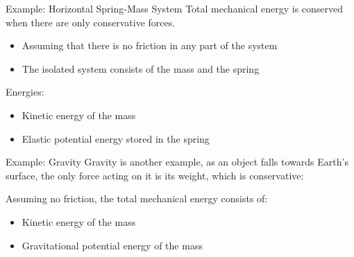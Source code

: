 \documentclass[12pt,compress,aspectratio=169]{beamer}
\newcommand{\mb}[1]{\ensuremath\mathbf{#1}}
\begin{document}
\begin{frame}{Example: Horizontal Spring-Mass System}
  Total mechanical energy is conserved when there are only conservative forces.
  \begin{itemize}
  \item Assuming that there is no friction in any part of the system
  \item The isolated system consists of the mass and the spring
  \end{itemize}  
  Energies:
  \begin{itemize}
  \item Kinetic energy of the mass
  \item Elastic potential energy stored in the spring
  \end{itemize}
  \begin{center}
  \end{center}
\end{frame}


\begin{frame}{Example: Gravity}
  Gravity is another example, as an object falls towards Earth's surface,
  the only force acting on it is its weight, which is conservative:
  \begin{center}
  \end{center}
  Assuming no friction, the total mechanical energy consists of:
  \begin{itemize}
  \item Kinetic energy of the mass
  \item Gravitational potential energy of the mass
  \end{itemize}
\end{frame}
\end{document}
